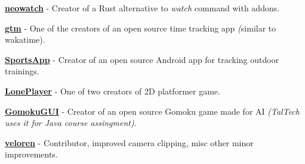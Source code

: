 \documentclass[letterpaper]{deedy-resume} %
\begin{document}
\begin{minipage}[t]{0.66\textwidth}
\begin{tightitemize}
  \item \textbf{\href{https://github.com/kilpkonn/neowatch}{neowatch}} - Creator of a Rust alternative to \textit{watch} command with addons.
  \item \textbf{\href{https://github.com/DEVELOPEST}{gtm}} - One of the creators of an open source time tracking app \textit(similar to wakatime).
  \item \textbf{\href{https://github.com/kilpkonn/SportsApp}{SportsApp}} - Creator of an open source Android app for tracking outdoor trainings.
  \item \textbf{\href{https://github.com/kilpkonn/LonePlayer}{LonePlayer}} - One of two creators of 2D platformer game.
  \item \textbf{\href{https://github.com/kilpkonn/GomokuGUI}{GomokuGUI}} - Creator of an open source Gomoku game made for AI \textit{(TalTech uses it for Java course assingment)}.
  \item \textbf{\href{https://veloren.net/}{veloren}} - Contributor, improved camera clipping, misc other minor improvements.
\end{tightitemize}

\sectionspace %



%
%


%
%


\end{minipage}
\end{document}
